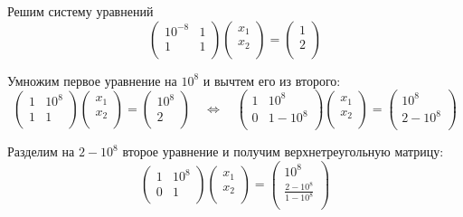 \documentclass{article}
\begin{document}
\begin{example}
	Решим систему уравнений
	\[
		\begin{pmatrix}
			10^{-8}	& 1	\\
			1	& 1	\\
		\end{pmatrix}
		\begin{pmatrix}
			x_1 \\
			x_2 \\
		\end{pmatrix}
		=
		\begin{pmatrix}
			1 \\
			2 \\
		\end{pmatrix}
	\]

	Умножим первое уравнение на $10^8$ и вычтем его из второго:
	\[
		\begin{pmatrix}
			1	& 10^8	\\
			1	& 1	\\
		\end{pmatrix}
		\begin{pmatrix}	
			x_1 \\
			x_2 \\
		\end{pmatrix}
		=
		\begin{pmatrix}
			10^8 \\
			2    \\
		\end{pmatrix}
		\quad\Leftrightarrow\quad
		\begin{pmatrix}
			1	& 10^8	\\
			0	&1-10^8	\\
		\end{pmatrix}
		\begin{pmatrix}
			x_1 \\
			x_2 \\
		\end{pmatrix}
		=
		\begin{pmatrix}
			10^8 \\
			2-10^8 \\
		\end{pmatrix}
	\]

	Разделим на $2-10^8$ второе уравнение и получим верхнетреугольную
	матрицу:
	\[
		\begin{pmatrix}
			1	& 10^8	\\
			0	& 1	\\
		\end{pmatrix}
		\begin{pmatrix}
			x_1 \\
			x_2 \\
		\end{pmatrix}
		=
		\begin{pmatrix}
			10^8 \\
			\frac{2-10^8}{1-10^8} \\
		\end{pmatrix}
	\]


\end{example}
\end{document}
